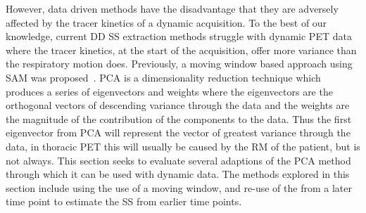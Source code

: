             However, data driven methods have the disadvantage that they are adversely affected by the tracer kinetics of a dynamic acquisition. To the best of our knowledge, current \gls{DD} \gls{SS} extraction methods struggle with dynamic \gls{PET} data where the tracer kinetics, at the start of the acquisition, offer more variance than the respiratory motion does. Previously, a moving window based approach using \gls{SAM} was proposed~. \gls{PCA} is a dimensionality reduction technique which produces a series of eigenvectors and weights where the eigenvectors are the orthogonal vectors of descending variance through the data and the weights are the magnitude of the contribution of the components to the data. Thus the first eigenvector from \gls{PCA} will represent the vector of greatest variance through the data, in thoracic \gls{PET} this will usually be caused by the \gls{RM} of the patient, but is not always. This section seeks to evaluate several adaptions of the \gls{PCA} method through which it can be used with dynamic data. The methods explored in this section include using the use of a moving window, and re-use of the  from a later time point to estimate the \gls{SS} from earlier time points.
        
